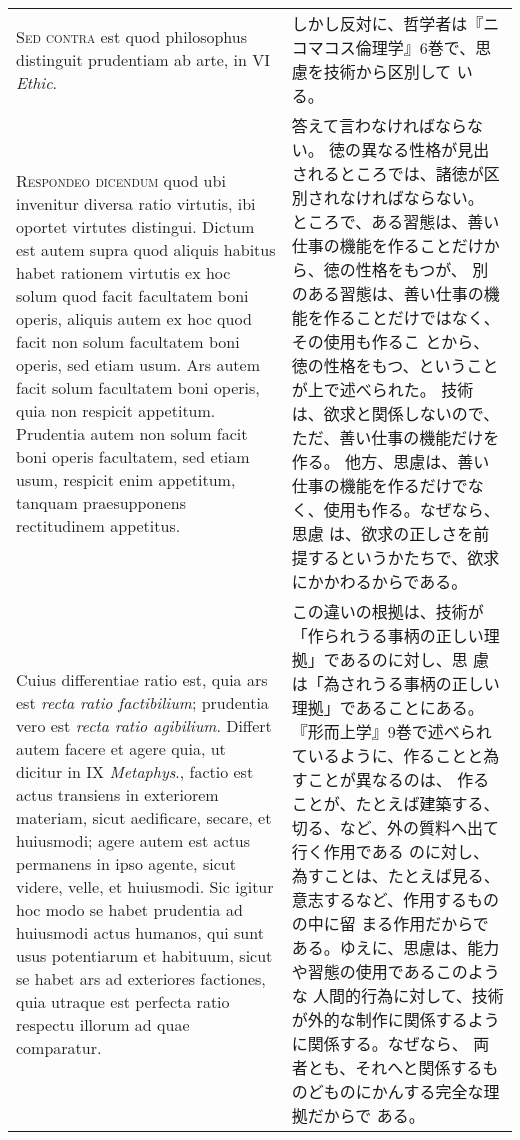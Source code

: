 \documentclass[10pt]{jsarticle} %
\begin{document}
\begin{longtable}{p{21em}p{21em}}
{\scshape Sed contra} est quod philosophus
 distinguit prudentiam ab arte, in VI {\itshape Ethic}.

&
しかし反対に、哲学者は『ニコマコス倫理学』6巻で、思慮を技術から区別して
 いる。

\\



{\scshape Respondeo dicendum} quod ubi invenitur
 diversa ratio virtutis, ibi oportet virtutes distingui. Dictum est
 autem supra quod aliquis habitus habet rationem virtutis ex hoc solum
 quod facit facultatem boni operis, aliquis autem ex hoc quod facit non
 solum facultatem boni operis, sed etiam usum. Ars autem facit solum
 facultatem boni operis, quia non respicit appetitum. Prudentia autem
 non solum facit boni operis facultatem, sed etiam usum, respicit enim
 appetitum, tanquam praesupponens rectitudinem appetitus. 

&
答えて言わなければならない。
徳の異なる性格が見出されるところでは、諸徳が区別されなければならない。
ところで、ある習態は、善い仕事の機能を作ることだけから、徳の性格をもつが、
 別のある習態は、善い仕事の機能を作ることだけではなく、その使用も作るこ
 とから、徳の性格をもつ、ということが上で述べられた。
技術は、欲求と関係しないので、ただ、善い仕事の機能だけを作る。
他方、思慮は、善い仕事の機能を作るだけでなく、使用も作る。なぜなら、思慮
 は、欲求の正しさを前提するというかたちで、欲求にかかわるからである。

\\



Cuius differentiae ratio est, quia ars est {\itshape recta ratio
 factibilium}; prudentia vero est {\itshape recta ratio
 agibilium}. Differt autem facere et agere quia, ut dicitur in IX
 {\itshape Metaphys}., factio est actus transiens in exteriorem
 materiam, sicut aedificare, secare, et huiusmodi; agere autem est actus
 permanens in ipso agente, sicut videre, velle, et huiusmodi. Sic igitur
 hoc modo se habet prudentia ad huiusmodi actus humanos, qui sunt usus
 potentiarum et habituum, sicut se habet ars ad exteriores factiones,
 quia utraque est perfecta ratio respectu illorum ad quae comparatur.



&

この違いの根拠は、技術が「作られうる事柄の正しい理拠」であるのに対し、思
 慮は「為されうる事柄の正しい理拠」であることにある。
『形而上学』9巻で述べられているように、作ることと為すことが異なるのは、
 作ることが、たとえば建築する、切る、など、外の質料へ出て行く作用である
 のに対し、為すことは、たとえば見る、意志するなど、作用するものの中に留
 まる作用だからである。ゆえに、思慮は、能力や習態の使用であるこのような
 人間的行為に対して、技術が外的な制作に関係するように関係する。なぜなら、
 両者とも、それへと関係するものどものにかんする完全な理拠だからで
 ある。


\end{longtable}
\end{document}
